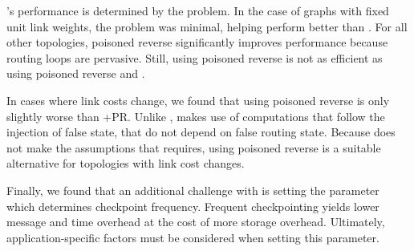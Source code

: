 \seconds's performance is determined by the \infinity problem. In the case of \er graphs with fixed unit link weights, the \infinity problem was minimal, 
helping \second perform better than \purges. %
For all other topologies, poisoned reverse significantly improves \second performance because routing loops are pervasive.
Still, \second using poisoned reverse is not as efficient as \cpr using poisoned reverse and \purges.

In cases where link costs change, we found that \purge using poisoned reverse is only slightly worse than \cprs+{\textsc PR}. %
Unlike \cprs, \purge makes use of computations that follow the injection of false state, that do not depend on false routing state.  
Because \purge does not make the assumptions that \cpr requires, \purge using poisoned reverse is a suitable alternative for topologies with link cost changes.



Finally, we found that an additional challenge with \cpr is setting the parameter which determines checkpoint frequency.
Frequent checkpointing yields lower message and time overhead at the cost of more storage overhead. Ultimately, application-specific factors must be considered
when setting this parameter. 
